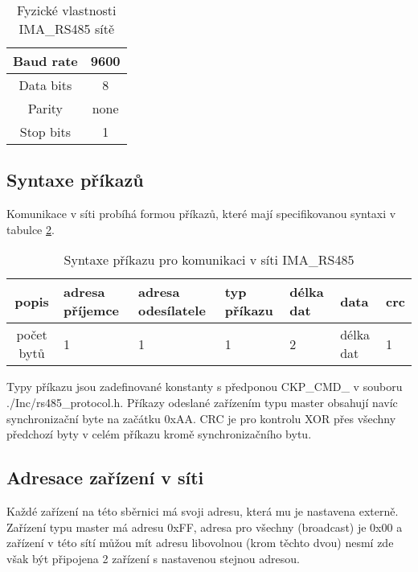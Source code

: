 \begin{table}[!h]
    \centering
    \begin{tabular}{ |c|c| }
     \hline

     Baud rate              & 9600           \\ \hline
     Data bits              & 8                 \\ \hline
     Parity                 & none              \\ \hline
     Stop bits              & 1                 \\ \hline

    \end{tabular}
    \caption{Fyzické vlastnosti IMA\_RS485 sítě}
    \label{table:3}
\end{table}

\newpage
\subsection{Syntaxe příkazů}
Komunikace v síti probíhá formou příkazů, které mají specifikovanou syntaxi v tabulce \ref{table:syntaxePrikazu}.

\begin{table}[!h]
    \centering
\begin{tabular}{ |c|| p{1.5cm} | p{1.5cm} | p{1cm} | p{1cm} | p{1cm} | p{1cm} | }
 \hline
 popis      & adresa příjemce & adresa odesílatele & typ příkazu & délka dat & data & crc\\ \hline
 počet bytů & 1               & 1   & 1     & 2     & délka dat     & 1 \\ 
 \hline
\end{tabular}
    \caption{Syntaxe příkazu pro komunikaci v síti IMA\_RS485}
    \label{table:syntaxePrikazu}
\end{table}

Typy příkazu jsou zadefinované konstanty s předponou CKP\_CMD\_ v souboru ./Inc/rs485\_protocol.h.
Příkazy odeslané zařízením typu master obsahují navíc synchronizační byte na začátku 0xAA.
CRC je pro kontrolu XOR přes všechny předchozí byty v celém příkazu kromě synchronizačního bytu.

\subsection{Adresace zařízení v síti}
Každé zařízení na této sběrnici má svoji adresu, která mu je nastavena externě. Zařízení typu master má adresu  0xFF, adresa pro všechny (broadcast) je 0x00 a zařízení v této sítí můžou mít adresu libovolnou (krom těchto dvou) nesmí zde však být připojena 2 zařízení s nastavenou stejnou adresou.

